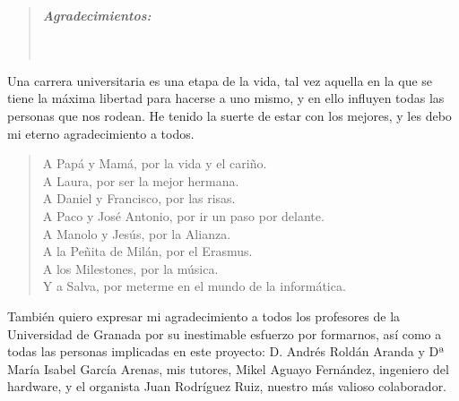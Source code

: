 \cleardoublepage
{}
{}

\vspace*{2.5cm}


\begin{quotation}
\noindent \begin{center}
\textbf{\emph{\Large Agradecimientos:}}\textbf{\emph{\large }}\\
\textbf{\emph{\large }}\\
\textbf{\emph{\large }}\\
\textbf{\emph{\large }}
\par\end{center}{\large \par}
\end{quotation}

\begin{onehalfspace}

Una carrera universitaria es una etapa de la vida, tal vez aquella en la que se tiene la máxima libertad para hacerse a uno mismo, y en ello influyen todas las personas que nos rodean. He tenido la suerte de estar con los mejores, y les debo mi eterno agradecimiento a todos.

\begin{quote}
	A Papá y Mamá, por la vida y el cariño. \\
	A Laura, por ser la mejor hermana. \\
	A Daniel y Francisco, por las risas. \\
	A Paco y José Antonio, por ir un paso por delante. \\
	A Manolo y Jesús, por la Alianza. \\
	A la Peñita de Milán, por el Erasmus. \\
	A los Milestones, por la música. \\
	Y a Salva, por meterme en el mundo de la informática.
\end{quote}

También quiero expresar mi agradecimiento a todos los profesores de la Universidad de Granada por su inestimable esfuerzo por formarnos, así como a todas las personas implicadas en este proyecto: D. Andrés Roldán Aranda y Dª María Isabel García Arenas, mis tutores, Mikel Aguayo Fernández, ingeniero del hardware, y el organista Juan Rodríguez Ruiz, nuestro más valioso colaborador.

\end{onehalfspace}


\clearpage{\pagestyle{empty}\cleardoublepage}%
